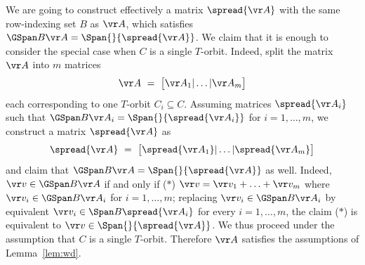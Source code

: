 We are going to construct effectively a matrix $\spread {\vr A}$ with the same row-indexing set $B$
as $\vr A$, which
satisfies $\GSpan B {\vr A} = \Span {} {\spread {\vr A}}$.
We claim that it is enough to consider the special case when $C$ is a single $T$-orbit.
Indeed, split the matrix $\vr A$ into $m$ matrices
\[
\vr A \ = \ \begin{bmatrix} \vr A_1 | \ldots | \vr A_m \end{bmatrix}
\]
each corresponding to one $T$-orbit $C_i \subseteq C$. 
Assuming matrices $\spread{\vr A_i}$ such that
$\GSpan B {\vr A_i} = \Span {} {\spread {\vr A_i}}$ for $i = 1, \ldots, m$, we construct a matrix $\spread{\vr A}$ as
\[
\spread{\vr A} \  =  \ \begin{bmatrix} \spread{\vr A_1} | \ldots | \spread{\vr A_m} \end{bmatrix}
\]
and claim that $\GSpan B {\vr A} = \Span {} {\spread {\vr A}}$ as well. 
Indeed, $\vr v \in \GSpan B {\vr A}$ if and only if ($*$)
$\vr v = \vr v_1 + \ldots + \vr v_m$ where $\vr v_i \in \GSpan B {\vr A_i}$ for $i = 1, \ldots, m$;
replacing $\vr v_i \in \GSpan B {\vr A_i}$ by equivalent $\vr v_i \in \Span B {\spread{\vr A_i}}$
for every $i=1,\ldots, m$, the claim ($*$) is equivalent to
$\vr v \in \Span {} {\spread{\vr A}}$.
We thus proceed under the assumption that $C$ is a single $T$-orbit.
%
Therefore $\vr A$ satisfies the assumptions of Lemma~\ref{lem:wd}. %


